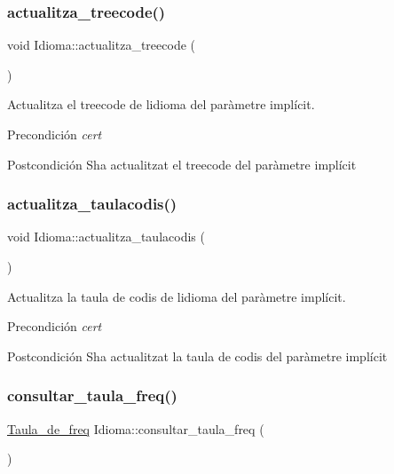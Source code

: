 \subsubsection{\texorpdfstring{actualitza\+\_\+treecode()}{actualitza\_treecode()}}
{\footnotesize\ttfamily void Idioma\+::actualitza\+\_\+treecode (\begin{DoxyParamCaption}{ }\end{DoxyParamCaption})}



Actualitza el treecode de l\textquotesingle{}idioma del paràmetre implícit. 

\begin{DoxyPrecond}{Precondición}
{\itshape cert} 
\end{DoxyPrecond}
\begin{DoxyPostcond}{Postcondición}
S\textquotesingle{}ha actualitzat el treecode del paràmetre implícit 
\end{DoxyPostcond}
\mbox{\label{class_idioma_ac089a0e4b79ca8f3df040e204a3de7dd}} 
\subsubsection{\texorpdfstring{actualitza\+\_\+taulacodis()}{actualitza\_taulacodis()}}
{\footnotesize\ttfamily void Idioma\+::actualitza\+\_\+taulacodis (\begin{DoxyParamCaption}{ }\end{DoxyParamCaption})}



Actualitza la taula de codis de l\textquotesingle{}idioma del paràmetre implícit. 

\begin{DoxyPrecond}{Precondición}
{\itshape cert} 
\end{DoxyPrecond}
\begin{DoxyPostcond}{Postcondición}
S\textquotesingle{}ha actualitzat la taula de codis del paràmetre implícit 
\end{DoxyPostcond}
\mbox{\label{class_idioma_a3d06a9d14291a5b59e0de1a65512ed80}} 
\subsubsection{\texorpdfstring{consultar\+\_\+taula\+\_\+freq()}{consultar\_taula\_freq()}}
{\footnotesize\ttfamily \hyperlink{class_taula__de__freq}{Taula\+\_\+de\+\_\+freq} Idioma\+::consultar\+\_\+taula\+\_\+freq (\begin{DoxyParamCaption}{ }\end{DoxyParamCaption})}



